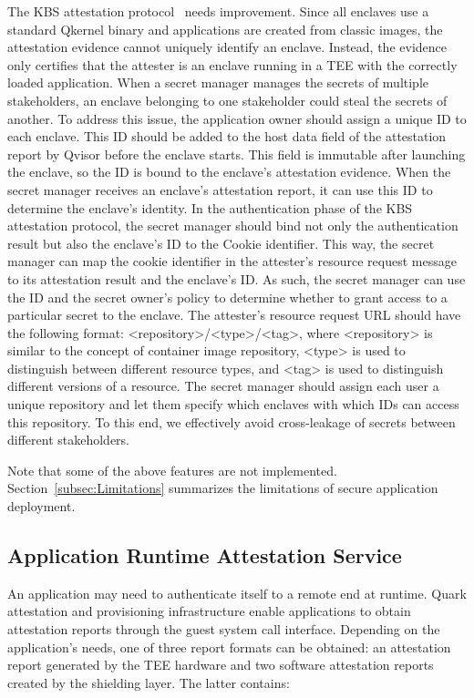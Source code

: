 The KBS attestation protocol~\cite*{kbs_Attestation_protocol} needs improvement. Since all enclaves use a standard Qkernel binary and applications are created from classic images, the attestation evidence cannot uniquely identify an enclave. Instead, the evidence only certifies that the attester is an enclave running in a TEE with the correctly loaded application. 
When a secret manager manages the secrets of multiple stakeholders, an enclave belonging to one stakeholder could steal the secrets of another. To address this issue, the application owner should assign a unique ID to each enclave. This ID should be added to the host data field of the attestation report by Qvisor before the enclave starts. This field is immutable after 
launching the enclave, so the ID is bound to the enclave's attestation evidence. When the secret manager receives an enclave's attestation report, it can use this ID to determine the enclave's identity. In the authentication phase of the KBS attestation protocol, the secret manager should bind not only the authentication result but also the enclave's ID to the Cookie identifier. 
This way, the secret manager can map the cookie identifier in the attester's resource request message to its attestation result and the enclave's ID. As such, the secret manager can use the ID and the secret owner's policy to determine whether to grant access to a particular secret to the enclave. The attester's resource request URL should have the following 
format: <repository>/<type>/<tag>, where <repository> is similar to the concept of container image repository, <type> is used to distinguish between different resource types, and <tag> is used to distinguish different versions of a resource. The secret manager should assign each user a unique repository and let them specify which enclaves with which IDs can access 
this repository. To this end, we effectively avoid cross-leakage of secrets between different stakeholders.

Note that some of the above features are not implemented. Section~\ref{subsec:Limitations} summarizes the limitations of secure application deployment.

\subsection{Application Runtime Attestation Service}
\label{sec:runtime_attesation}

An application may need to authenticate itself to a  remote end at runtime. Quark attestation and provisioning infrastructure enable applications to obtain attestation reports through the guest system call interface. Depending on the application's needs, one of three report formats can be 
obtained: an attestation report generated by the TEE hardware and two software attestation reports created by the shielding layer. The latter contains:

